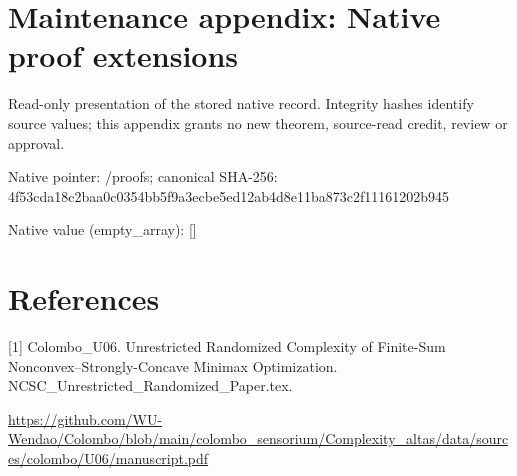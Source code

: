 \documentclass[10pt,a4paper]{article}
\begin{document}
\section{Maintenance appendix: Native proof extensions}


Read-only presentation of the stored native record. Integrity hashes identify source values; this appendix grants no new theorem, source-read credit, review or approval.



Native pointer: /proofs; canonical SHA-256: 4f53cda18c2baa0c0354bb5f\allowbreak{}9a3ecbe5ed12ab4d8e11ba87\allowbreak{}3c2f11161202b945



Native value (empty\_array): []



\section{References}


[1] Colombo\_U06. Unrestricted Randomized Complexity of Finite-Sum Nonconvex--Strongly-Concave Minimax Optimization. NCSC\_Unrestricted\_Randomized\_Paper.tex.



\url{https://github.com/WU-Wendao/Colombo/blob/main/colombo_sensorium/Complexity_altas/data/sources/colombo/U06/manuscript.pdf}
\end{document}
